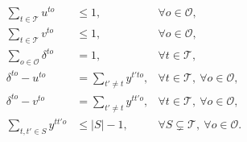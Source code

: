 
\begin{align}
    \sum_{t\in \mathcal T} u^{to} & \leq 1, &\forall o\in \mathcal O, \label{st:DEnt}\\%
    \sum_{t\in \mathcal T} v^{to} & \leq 1, &\forall o\in \mathcal O, \label{st:DExt}\\%
    \sum_{o\in \mathcal O} \delta^{to} & = 1, &\forall t\in \mathcal T, \label{st:DIn} \\
    \delta^{to} - u^{to} & = \sum_{t'\neq t} y^{t'to}, &\forall t\in \mathcal T,\:\forall o\in \mathcal O, \label{st:Dinu}\\
    \delta^{to} - v^{to} & = \sum_{t'\neq t} y^{tt'o}, &\forall t\in \mathcal T,\:\forall o\in \mathcal O, \label{st:Dinv}\\
    \sum_{t, t'\in S}y^{tt'o} & \leq |S|-1, &\forall S\subsetneq\mathcal T,\:\forall o\in\mathcal O.
    \label{st:SEC}
\end{align}


